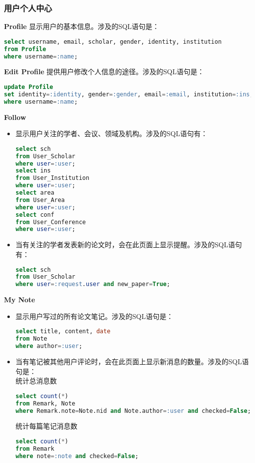 \subsubsection{用户个人中心}
\noindent
{\bf Profile} 显示用户的基本信息。涉及的SQL语句是：
\begin{lstlisting}[language=SQL]
select username, email, scholar, gender, identity, institution
from Profile
where username=:name;
\end{lstlisting}
{\bf Edit Profile} 提供用户修改个人信息的途径。涉及的SQL语句是：
\begin{lstlisting}[language=SQL]
update Profile
set identity=:identity, gender=:gender, email=:email, institution=:ins,password=:pw
where username=:name;
\end{lstlisting}
{\bf Follow}
\begin{itemize}
\item 显示用户关注的学者、会议、领域及机构。涉及的SQL语句有：
\begin{lstlisting}[language=SQL]
select sch
from User_Scholar
where user=:user;
select ins
from User_Institution
where user=:user;
select area
from User_Area
where user=:user;
select conf
from User_Conference
where user=:user;
\end{lstlisting}
\item 当有关注的学者发表新的论文时，会在此页面上显示提醒。涉及的SQL语句有：
\begin{lstlisting}[language=SQL]
select sch
from User_Scholar
where user=:request.user and new_paper=True;
\end{lstlisting}
\end{itemize}
{\bf My Note}
\begin{itemize}
\item 显示用户写过的所有论文笔记。涉及的SQL语句是：
\begin{lstlisting}[language=SQL]
select title, content, date
from Note
where author=:user;
\end{lstlisting}
\item 当有笔记被其他用户评论时，会在此页面上显示新消息的数量。涉及的SQL语句是：\\
统计总消息数
\begin{lstlisting}[language=SQL]
select count(*)
from Remark, Note
where Remark.note=Note.nid and Note.author=:user and checked=False;
\end{lstlisting}
统计每篇笔记消息数
\begin{lstlisting}[language=SQL]
select count(*)
from Remark
where note=:note and checked=False;
\end{lstlisting}
\end{itemize}
